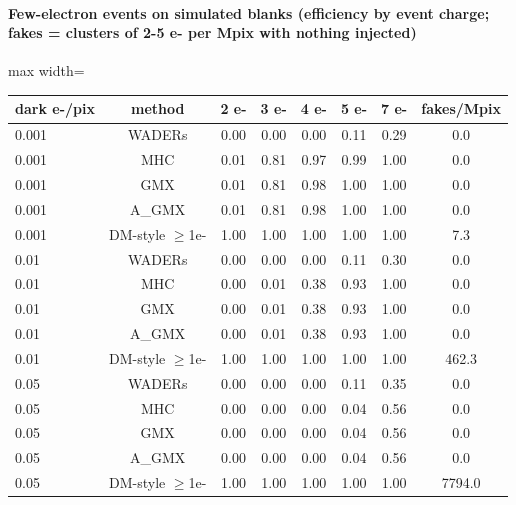 \paragraph{Few-electron events on simulated blanks (efficiency by event charge; fakes = clusters of 2-5 e- per Mpix with nothing injected)}
\begin{table}[H]\centering\footnotesize
\begin{adjustbox}{max width=\linewidth}
\begin{tabular}{lccccccc}
\toprule
dark e-/pix & method & 2 e- & 3 e- & 4 e- & 5 e- & 7 e- & fakes/Mpix \\
\midrule
0.001 & WADERs & 0.00 & 0.00 & 0.00 & 0.11 & 0.29 & 0.0 \\
0.001 & MHC & 0.01 & 0.81 & 0.97 & 0.99 & 1.00 & 0.0 \\
0.001 & GMX & 0.01 & 0.81 & 0.98 & 1.00 & 1.00 & 0.0 \\
0.001 & A\_GMX & 0.01 & 0.81 & 0.98 & 1.00 & 1.00 & 0.0 \\
0.001 & DM-style $\ge$1e- & 1.00 & 1.00 & 1.00 & 1.00 & 1.00 & 7.3 \\
0.01 & WADERs & 0.00 & 0.00 & 0.00 & 0.11 & 0.30 & 0.0 \\
0.01 & MHC & 0.00 & 0.01 & 0.38 & 0.93 & 1.00 & 0.0 \\
0.01 & GMX & 0.00 & 0.01 & 0.38 & 0.93 & 1.00 & 0.0 \\
0.01 & A\_GMX & 0.00 & 0.01 & 0.38 & 0.93 & 1.00 & 0.0 \\
0.01 & DM-style $\ge$1e- & 1.00 & 1.00 & 1.00 & 1.00 & 1.00 & 462.3 \\
0.05 & WADERs & 0.00 & 0.00 & 0.00 & 0.11 & 0.35 & 0.0 \\
0.05 & MHC & 0.00 & 0.00 & 0.00 & 0.04 & 0.56 & 0.0 \\
0.05 & GMX & 0.00 & 0.00 & 0.00 & 0.04 & 0.56 & 0.0 \\
0.05 & A\_GMX & 0.00 & 0.00 & 0.00 & 0.04 & 0.56 & 0.0 \\
0.05 & DM-style $\ge$1e- & 1.00 & 1.00 & 1.00 & 1.00 & 1.00 & 7794.0 \\
\bottomrule
\end{tabular}
\end{adjustbox}
\end{table}

